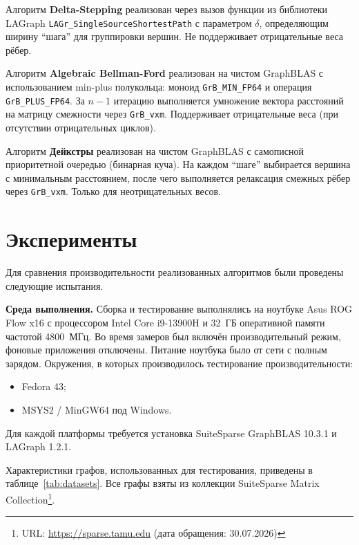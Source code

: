 \documentclass[a4paper]{article}
\begin{document}
Алгоритм \textbf{Delta-Stepping} реализован через вызов функции из библиотеки LAGraph
\texttt{LAGr\_SingleSourceShortestPath} с параметром $\delta$, определяющим ширину
``шага'' для группировки вершин. Не поддерживает отрицательные веса рёбер.

Алгоритм \textbf{Algebraic Bellman-Ford} реализован на чистом GraphBLAS с
использованием min-plus полукольца: моноид \texttt{GrB\_MIN\_FP64} и операция
\texttt{GrB\_PLUS\_FP64}. За $n-1$ итерацию выполняется умножение вектора расстояний
на матрицу смежности через \texttt{GrB\_vxm}. Поддерживает отрицательные веса
(при отсутствии отрицательных циклов).

Алгоритм \textbf{Дейкстры} реализован на чистом GraphBLAS с самописной приоритетной
очередью (бинарная куча). На каждом ``шаге'' выбирается вершина с минимальным расстоянием,
после чего выполняется релаксация смежных рёбер через \texttt{GrB\_vxm}.
Только для неотрицательных весов.

\section{Эксперименты}

Для сравнения производительности реализованных алгоритмов были проведены следующие испытания.

\textbf{Среда выполнения.} 
Сборка и тестирование выполнялись на ноутбуке Asus ROG Flow x16 с процессором Intel Core i9-13900H и 32~ГБ оперативной памяти частотой 4800~МГц. 
Во время замеров был включён производительный режим, фоновые приложения отключены. Питание ноутбука было от сети с полным зарядом.
Окружения, в которых производилось тестирование производительности:
\begin{itemize}
    \item Fedora 43;
    \item MSYS2 / MinGW64 под Windows.
\end{itemize}


Для каждой платформы требуется установка SuiteSparse GraphBLAS 10.3.1 и LAGraph 1.2.1.

Характеристики графов, использованных для тестирования, приведены в
таблице~\ref{tab:datasets}. Все графы взяты из коллекции SuiteSparse Matrix
Collection\footnote{URL: \url{https://sparse.tamu.edu} (дата обращения: 30.07.2026)}.
\end{document}
